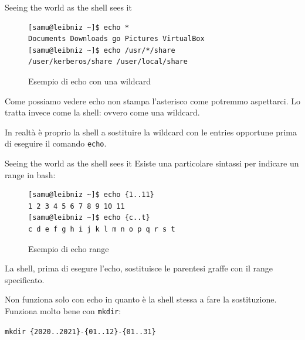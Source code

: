 \documentclass{beamer}
\begin{document}
\begin{frame}[fragile]{Seeing the world as the shell sees it}
  \begin{figure}
    \begin{lstlisting}
[samu@leibniz ~]$ echo *
Documents Downloads go Pictures VirtualBox
[samu@leibniz ~]$ echo /usr/*/share
/user/kerberos/share /user/local/share
    \end{lstlisting}
    \caption{Esempio di echo con una wildcard}
  \end{figure}

  Come possiamo vedere echo non stampa l'asterisco come potremmo aspettarci. 
  Lo tratta invece come la shell: ovvero come una wildcard. \medskip \pause

  In realtà è proprio la shell a sostituire la wildcard con le entries opportune
  prima di eseguire il comando \texttt{echo}.
\end{frame}

\begin{frame}[fragile]{Seeing the world as the shell sees it}
  Esiste una particolare sintassi per indicare un range in bash:
  \begin{figure}
    \begin{lstlisting}
[samu@leibniz ~]$ echo {1..11}
1 2 3 4 5 6 7 8 9 10 11
[samu@leibniz ~]$ echo {c..t}
c d e f g h i j k l m n o p q r s t
    \end{lstlisting}
    \caption{Esempio di echo range}
  \end{figure}

  La shell, prima di esegure l'echo, sostituisce le parentesi graffe con il 
  range specificato.\medskip \pause

  Non funziona solo con echo in quanto è la shell stessa a fare la sostituzione.
  Funziona molto bene con \texttt{mkdir}: \smallskip 

  \texttt{mkdir \{2020..2021\}-\{01..12\}-\{01..31\}}
\end{frame}
\end{document}
